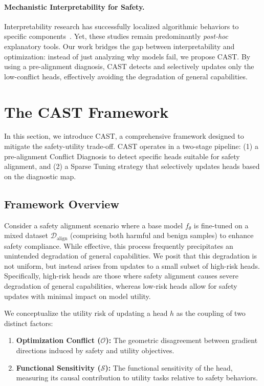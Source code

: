 \documentclass[11pt]{article}
\begin{document}
\paragraph{Mechanistic Interpretability for Safety.}
Interpretability research has successfully localized algorithmic behaviors to specific components~\cite{olsson2022incontext,zhou2025roleattentionheadslarge}. 
Yet, these studies remain predominantly \textit{post-hoc} explanatory tools. 
Our work bridges the gap between interpretability and optimization: instead of just analyzing why models fail, we propose CAST. 
By using a pre-alignment diagnosis, CAST detects and selectively updates only the low-conflict heads, effectively avoiding the degradation of general capabilities.



\section{The CAST Framework}
\label{sec:diagnosis}

In this section, we introduce CAST, a comprehensive framework designed to mitigate the safety-utility trade-off. 
CAST operates in a two-stage pipeline: (1) a pre-alignment Conflict Diagnosis to detect specific heads suitable for safety alignment, and (2) a Sparse Tuning strategy that selectively updates heads based on the diagnostic map.

\subsection{Framework Overview}
Consider a safety alignment scenario where a base model $f_\theta$ is fine-tuned on a mixed dataset $\mathcal{D}_{\text{align}}$ (comprising both harmful and benign samples) to enhance safety compliance. While effective, this process frequently precipitates an unintended degradation of general capabilities. We posit that this degradation is not uniform, but instead arises from updates to a small subset of high-risk heads. Specifically, high-risk heads are those where safety alignment causes severe degradation of general capabilities, whereas low-risk heads allow for safety updates with minimal impact on model utility.

We conceptualize the utility risk of updating a head $h$ as the coupling of two distinct factors:
\begin{enumerate}
    \item \textbf{Optimization Conflict ($\mathcal{O}$):} The geometric disagreement between gradient directions induced by safety and utility objectives.
    \item \textbf{Functional Sensitivity ($\mathcal{S}$):} The functional sensitivity of the head, measuring its causal contribution to utility tasks relative to safety behaviors.
\end{enumerate}
\end{document}
